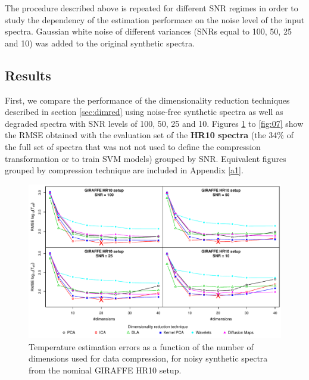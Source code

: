 \documentclass[a4paper,fleqn,usenatbib]{mnras}
\begin{document}
{{{The procedure described above is repeated for different SNR regimes in
order to study the dependency of the estimation performace on the
noise level of the input spectra. Gaussian white noise of different
variances (SNRs equal to 100, 50, 25 and 10) was added to the original
synthetic spectra. 

\subsection{Results}

First, we compare the performance of the dimensionality reduction
techniques described in section \ref{sec:dimred} using noise-free
synthetic spectra as well as degraded spectra with SNR levels of 100,
50, 25 and 10. Figures \ref{fig:02} to \ref{fig:07} show the RMSE
obtained with the evaluation set of the {\bf HR10 spectra} (the 34\% 
of the full set of spectra that was not not used to define the 
compression transformation or to train SVM models) grouped by SNR. 
Equivalent figures grouped by compression technique are included in 
Appendix \ref{a1}.

\begin{figure}
\centering\includegraphics[width=\textwidth]{flamesHR10_Teff_log_BestSVM_N-RMSE_test.pdf}
\caption{Temperature estimation errors as a function of the number of
  dimensions used for data compression, for noisy synthetic
  spectra from the nominal GIRAFFE HR10 setup.}
\label{fig:02}
\end{figure}

}}}
\end{document}
